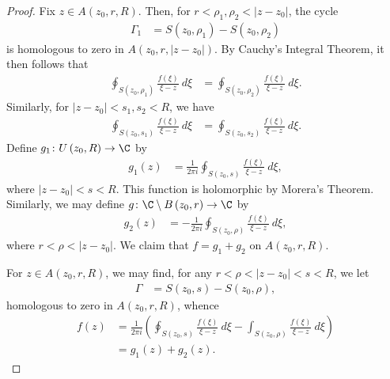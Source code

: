 \documentclass[10pt]{mypackage}
\begin{document}
\begin{proof}
  Fix $z\in A\left( z_0,r,R \right)$. Then, for $r < \rho_1,\rho_2 < \left\vert z-z_0 \right\vert$, the cycle
  \begin{align*}
    \Gamma_1 &= S\left( z_0,\rho_1 \right) - S\left( z_0,\rho_2 \right)
  \end{align*}
  is homologous to zero in $A\left( z_0,r,\left\vert z-z_0 \right\vert \right)$. By Cauchy's Integral Theorem, it then follows that
  \begin{align*}
    \oint_{S\left( z_0,\rho_1 \right)}^{} \frac{f\left( \xi \right)}{\xi-z}\:d\xi &= \oint_{S\left( z_0,\rho_2 \right)}^{} \frac{f\left( \xi \right)}{\xi-z}\:d\xi.
  \end{align*}
  Similarly, for $\left\vert z-z_0 \right\vert < s_1,s_2 < R$, we have
  \begin{align*}
    \oint_{S\left( z_0,s_1 \right)}^{} \frac{f\left( \xi \right)}{\xi-z}\:d\xi &= \oint_{S\left( z_0,s_2 \right)}^{} \frac{f\left( \xi \right)}{\xi-z}\:d\xi.
  \end{align*}
  Define $g_1\colon U\left( z_0,R \right)\rightarrow \C$ by
  \begin{align*}
    g_1(z) &= \frac{1}{2\pi i} \oint_{S\left( z_0,s \right)}^{} \frac{f\left( \xi \right)}{\xi - z}\:d\xi,
  \end{align*}
  where $ \left\vert z-z_0 \right\vert < s < R $. This function is holomorphic by Morera's Theorem. Similarly, we may define $g\colon \C\setminus B\left( z_0,r \right)\rightarrow \C$ by
  \begin{align*}
    g_2\left( z \right) &= -\frac{1}{2\pi i} \oint_{S\left( z_0,\rho \right)}^{} \frac{f\left( \xi \right)}{\xi-z}\:d\xi,
  \end{align*}
  where $r < \rho < \left\vert z-z_0 \right\vert$. We claim that $f = g_1 + g_2$ on $A\left( z_0,r,R \right)$.%

  For $z\in A\left( z_0,r,R \right)$, we may find, for any $r < \rho < \left\vert z-z_0 \right\vert < s < R$, we let
  \begin{align*}
    \Gamma &= S\left( z_0,s \right) - S\left( z_0,\rho \right),
  \end{align*}
  homologous to zero in $A\left( z_0,r,R \right)$, whence
  \begin{align*}
    f\left( z \right) &= \frac{1}{2\pi i} \left( \oint_{S\left( z_0,s \right)}^{} \frac{f\left( \xi \right)}{\xi-z}\:d\xi - \int_{S\left( z_0,\rho \right)}^{} \frac{f\left( \xi \right)}{\xi - z}\:d\xi \right)\\
                      &= g_1\left( z \right) + g_2\left( z \right).
  \end{align*}
\end{proof}
\end{document}
